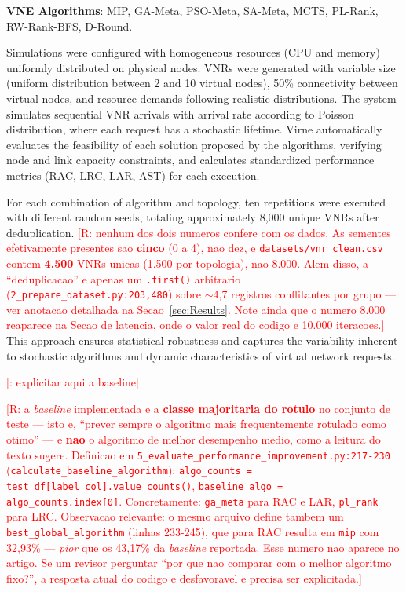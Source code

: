 \documentclass[runningheads]{llncs}
\begin{document}
\noindent\textbf{VNE Algorithms}: MIP, GA-Meta, PSO-Meta, SA-Meta, MCTS, PL-Rank, RW-Rank-BFS, D-Round.

\medskip
Simulations were configured with homogeneous resources (CPU and memory) uniformly distributed on physical nodes. VNRs were generated with variable size (uniform distribution between 2 and 10 virtual nodes), 50\% connectivity between virtual nodes, and resource demands following realistic distributions. The system simulates sequential VNR arrivals with arrival rate according to Poisson distribution, where each request has a stochastic lifetime. Virne automatically evaluates the feasibility of each solution proposed by the algorithms, verifying node and link capacity constraints, and calculates standardized performance metrics (RAC, LRC, LAR, AST) for each execution.

For each combination of algorithm and topology, ten repetitions were executed with different random seeds, totaling approximately 8,000 unique VNRs after deduplication. \textcolor{red}{[R: nenhum dos dois numeros confere com os dados. As sementes efetivamente presentes sao \textbf{cinco} (0 a 4), nao dez, e \texttt{datasets/vnr\_clean.csv} contem \textbf{4.500} VNRs unicas (1.500 por topologia), nao 8.000. Alem disso, a ``deduplicacao'' e apenas um \texttt{.first()} arbitrario (\texttt{2\_prepare\_dataset.py:203,480}) sobre $\sim$4,7 registros conflitantes por grupo --- ver anotacao detalhada na Secao~\ref{sec:Results}. Note ainda que o numero 8.000 reaparece na Secao de latencia, onde o valor real do codigo e 10.000 iteracoes.]} This approach ensures statistical robustness and captures the variability inherent to stochastic algorithms and dynamic characteristics of virtual network requests.

\textcolor{red}{[: explicitar aqui a baseline]}

\textcolor{red}{[R: a \emph{baseline} implementada e a \textbf{classe majoritaria do rotulo} no conjunto de teste --- isto e, ``prever sempre o algoritmo mais frequentemente rotulado como otimo'' --- e \textbf{nao} o algoritmo de melhor desempenho medio, como a leitura do texto sugere. Definicao em \texttt{5\_evaluate\_performance\_improvement.py:217-230} (\texttt{calculate\_baseline\_algorithm}): \texttt{algo\_counts = test\_df[label\_col].value\_counts()}, \texttt{baseline\_algo = algo\_counts.index[0]}. Concretamente: \texttt{ga\_meta} para RAC e LAR, \texttt{pl\_rank} para LRC.
Observacao relevante: o mesmo arquivo define tambem um \texttt{best\_global\_algorithm} (linhas 233-245), que para RAC resulta em \texttt{mip} com 32,93\% --- \emph{pior} que os 43,17\% da \emph{baseline} reportada. Esse numero nao aparece no artigo. Se um revisor perguntar ``por que nao comparar com o melhor algoritmo fixo?'', a resposta atual do codigo e desfavoravel e precisa ser explicitada.]}
\end{document}
